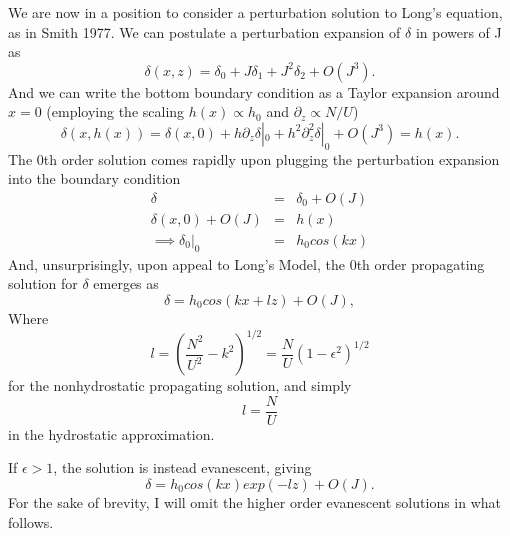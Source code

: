 \documentclass[12pt]{article}
\begin{document}
We are now in a position to consider a perturbation solution to Long's equation, as in Smith 1977. We can postulate a perturbation expansion of $\delta$ in powers of J as
\[
\delta(x,z) = \delta_0+ J\delta _1 +  J^2 \delta_2+ O(J^3).
\]
And we can write the bottom boundary condition as a Taylor expansion around $x=0$ (employing the scaling $h(x)\propto h_0$ and $\partial_z \propto N/U$)
\[
\delta(x,h(x)) = \delta(x,0) + h \partial_z \delta |_0 +  h^2 \partial_z^2 \delta |_0 + O(J^3) = h(x).
\]
The 0th order solution comes rapidly upon plugging the perturbation expansion into the boundary condition
\begin{eqnarray*}
	\delta &=& \delta_0 + O(J) \\
	\delta(x,0) + O(J) &=& h(x)\\
	\implies \delta_0|_0 &=& h_0cos(kx)
\end{eqnarray*}
And, unsurprisingly, upon appeal to Long's Model, the 0th order propagating solution for $\delta$ emerges as
\[
\delta = h_0cos(kx+lz)  + O(J),
\]
Where  
\[
l =(\frac{N^2}{U^2}-k^2)^{1/2} = \frac{N}{U}(1-\epsilon^2)^{1/2}
\]
for the nonhydrostatic propagating solution, and simply 
\[l=\frac{N}{U} \]
in the hydrostatic approximation. 

If $\epsilon>1$, the solution is instead evanescent, giving
\[
\delta = h_0cos(kx)exp(-lz)  + O(J).
\]
For the sake of brevity, I will omit the higher order evanescent solutions in what follows. 
\end{document}
